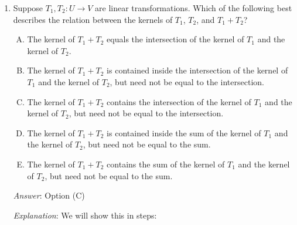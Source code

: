\documentclass[10pt]{amsart}
\begin{document}
\begin{enumerate}
  {\em Answer}: Option (E)

  {\em Explanation}: We can get counterexamples in one dimension:
  consider the situation where $T_1$ has matrix $[1]$ and $T_2$ has
  matrix $[-1]$. Then, both $T_1$ and $T_2$ are bijective (hence also
  injective and surjective) but the sum $T_1 + T_2$, which is the zero
  map, is neither injective nor surjective.

  {\em Performance review}: 7 out of 27 got this. 13 chose (D), 4
  chose (B), 2 chose (C), 1 left the question blank.

  {\em Historical note (last time)}: $6$ out of $26$ got this. $19$ chose (D),
  $1$ chose (C).

\item Suppose $T_1, T_2: U \to V$ are linear transformations. Which of
  the following best describes the relation between the kernels of
  $T_1$, $T_2$, and $T_1 + T_2$?

  \begin{enumerate}[(A)]
  \item The kernel of $T_1 + T_2$ equals the intersection of the
    kernel of $T_1$ and the kernel of $T_2$.
  \item The kernel of $T_1 + T_2$ is contained inside the intersection
    of the kernel of $T_1$ and the kernel of $T_2$, but need not be
    equal to the intersection.
  \item The kernel of $T_1 + T_2$ contains the intersection of the
    kernel of $T_1$ and the kernel of $T_2$, but need not be equal to
    the intersection.
  \item The kernel of $T_1 + T_2$ is contained inside the sum of the
    kernel of $T_1$ and the kernel of $T_2$, but need not be equal to
    the sum.
  \item The kernel of $T_1 + T_2$ contains the sum of the kernel of
    $T_1$ and the kernel of $T_2$, but need not be equal to the sum.
  \end{enumerate}

  {\em Answer}: Option (C)

  {\em Explanation}: We will show this in steps:


\end{enumerate}
\end{document}
